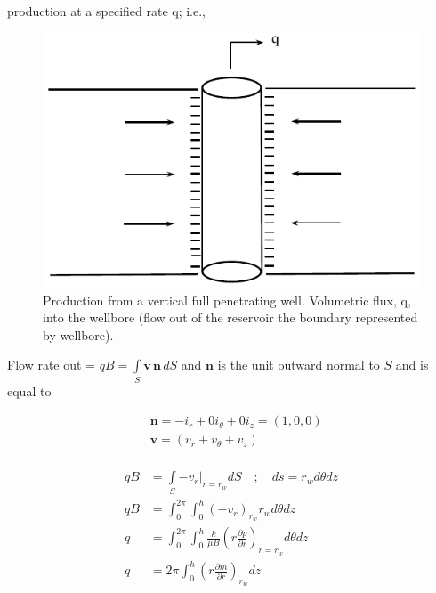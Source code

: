 \documentclass{llncs}
\numberwithin{equation}{section}
\numberwithin{figure}{section}
\numberwithin{table}{section}
\begin{document}
     production at a specified rate q; i.e.,
    \begin{figure}
        \begin{center}
        \includegraphics[scale=1]{Production_Full.pdf}
        \end{center}
        \caption{Production from a vertical full penetrating well. Volumetric flux, q, into the wellbore (flow out of the reservoir the boundary represented by wellbore).}
        \label{Production_Full}
    \end{figure}

    Flow rate out = $qB=\int\limits_{S}{\mathbf{v}\,\mathbf{n}\,dS}$ and $\mathbf{n}$ is the unit outward normal to $S$ and is equal to

    \begin{equation*}
        \begin{split}
        & \mathbf{n}=-{{i}_{r}}+0{{i}_{\theta }}+0{{i}_{z}}=\left( 1,0,0 \right) \\
        & \mathbf{v}=\left( {{v}_{r}}+{{v}_{\theta }}+{{v}_{z}} \right) \\
        \end{split}
    \end{equation*}

    \begin{equation*}
        \begin{split}
             qB&=\int\limits_{S}{-{{\left. {{v}_{r}} \right|}_{r={{r}_{w}}}}}dS\quad ;\quad ds={{r}_{w}}d\theta dz \\
             qB&=\int_{0}^{2\pi }{\int_{0}^{h}{{{\left( -{{v}_{r}} \right)}_{{{r}_{w}}}}{{r}_{w}}}}d\theta dz \\
             q&={{\int_{0}^{2\pi }{\int_{0}^{h}{\frac{k}{\mu B}\left( r\frac{\partial p}{\partial r} \right)}}}_{r={{r}_{w}}}}d\theta dz \\
             q&=2\pi {{\int_{0}^{h}{\left( r\frac{\partial m}{\partial r} \right)}}_{{{r}_{w}}}}dz \\
        \end{split}
    \end{equation*}
\end{document}

